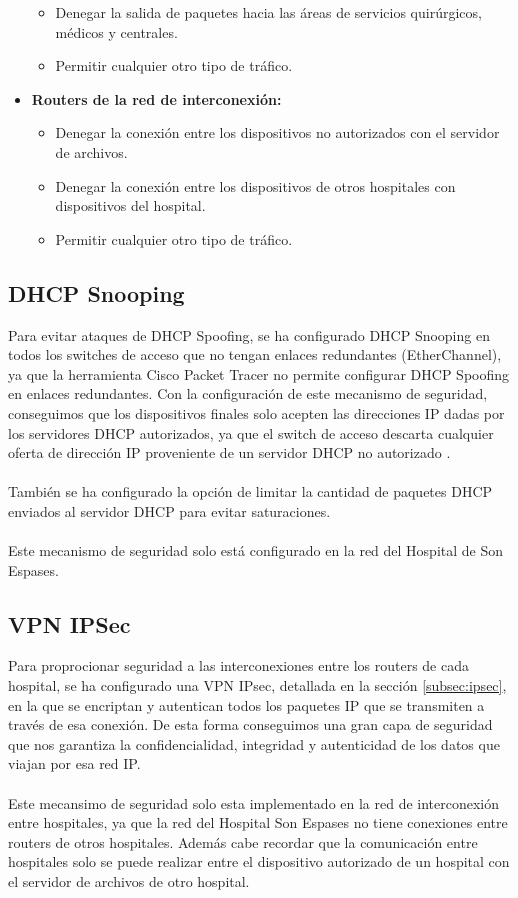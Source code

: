 \begin{itemize}
    \begin{itemize}
        \item Denegar la salida de paquetes hacia las áreas de servicios quirúrgicos, médicos y centrales.
        \item Permitir cualquier otro tipo de tráfico.
    \end{itemize}
    \item \textbf{Routers de la red de interconexión:}
    \begin{itemize}
        \item Denegar la conexión entre los dispositivos no autorizados con el servidor de archivos.
        \item Denegar la conexión entre los dispositivos de otros hospitales con dispositivos del hospital.
        \item Permitir cualquier otro tipo de tráfico.
    \end{itemize}
\end{itemize}

\subsection{DHCP Snooping}
Para evitar ataques de DHCP Spoofing, se ha configurado DHCP Snooping en todos los switches de acceso que no tengan enlaces redundantes (EtherChannel), ya que la herramienta Cisco Packet Tracer no permite 
configurar DHCP Spoofing en enlaces redundantes. Con la configuración de este mecanismo de seguridad, conseguimos que los dispositivos finales solo acepten las direcciones IP dadas por los servidores DHCP autorizados, 
ya que el switch de acceso descarta cualquier oferta de dirección IP proveniente de un servidor DHCP no autorizado \cite{cisco_dhcp_snooping}.
\\ \\
También se ha configurado la opción de limitar la cantidad de paquetes DHCP enviados al servidor DHCP para evitar saturaciones.
\\ \\
Este mecanismo de seguridad solo está configurado en la red del Hospital de Son Espases.

\subsection{VPN IPSec}
Para proprocionar seguridad a las interconexiones entre los routers de cada hospital, se ha configurado una VPN IPsec, detallada en la sección \ref{subsec:ipsec}, en la que se encriptan y autentican todos los paquetes IP que se transmiten a través de esa conexión.
De esta forma conseguimos una gran capa de seguridad que nos garantiza la confidencialidad, integridad y autenticidad de los datos que viajan por esa red IP.
\\ \\
Este mecansimo de seguridad solo esta implementado en la red de interconexión entre hospitales, ya que la red del Hospital Son Espases no tiene conexiones entre routers de otros hospitales. 
Además cabe recordar que la comunicación entre hospitales solo se puede realizar entre el dispositivo autorizado de un hospital con el servidor de archivos de otro hospital.

